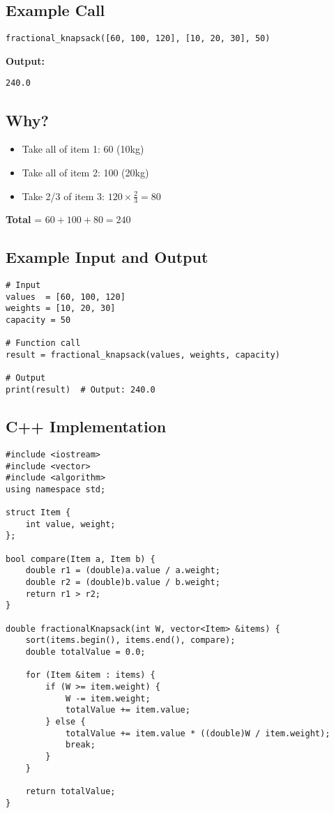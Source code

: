 \documentclass[14pt]{extarticle}
\begin{document}
\subsection*{Example Call}
\begin{verbatim}
fractional_knapsack([60, 100, 120], [10, 20, 30], 50)
\end{verbatim}

\textbf{Output:}
\begin{verbatim}
240.0
\end{verbatim}

\subsection*{Why?}
\begin{itemize}
    \item Take all of item 1: 60 (10kg)
    \item Take all of item 2: 100 (20kg)
    \item Take 2/3 of item 3: $120 \times \frac{2}{3} = 80$
\end{itemize}

\textbf{Total} = $60 + 100 + 80 = 240$

\subsection*{Example Input and Output}

\begin{verbatim}
# Input
values  = [60, 100, 120]
weights = [10, 20, 30]
capacity = 50

# Function call
result = fractional_knapsack(values, weights, capacity)

# Output
print(result)  # Output: 240.0
\end{verbatim}

\newpage
\subsection{C++ Implementation}
\begin{lstlisting}[style=cpp, caption={Fractional Knapsack in C++}]
#include <iostream>
#include <vector>
#include <algorithm>
using namespace std;

struct Item {
    int value, weight;
};

bool compare(Item a, Item b) {
    double r1 = (double)a.value / a.weight;
    double r2 = (double)b.value / b.weight;
    return r1 > r2;
}

double fractionalKnapsack(int W, vector<Item> &items) {
    sort(items.begin(), items.end(), compare);
    double totalValue = 0.0;

    for (Item &item : items) {
        if (W >= item.weight) {
            W -= item.weight;
            totalValue += item.value;
        } else {
            totalValue += item.value * ((double)W / item.weight);
            break;
        }
    }

    return totalValue;
}
\end{lstlisting}
\end{document}
